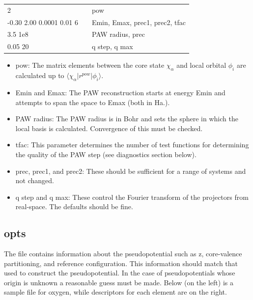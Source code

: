 \documentclass[11pt]{report}
\begin{document}
\begin{center}
\begin{tabular}{| l | c l |}
\hline
2						& &  pow \\
-0.30 2.00 0.0001 0.01 6		& & Emin, Emax, prec1, prec2, tfac \\
3.5 1e8					& & PAW radius, prec \\
0.05 20					& & q step, q max \\
\hline
\end{tabular}
\end{center}

\begin{itemize}
\item pow: The matrix elements between the core state $\chi_\alpha$ and local orbital $\phi_i$ are calculated
 up to $\langle \chi_\alpha \vert r^{pow} \vert \phi_i \rangle$. 
\item Emin and Emax: The PAW reconstruction starts at energy Emin and attempts to span the space to Emax (both in Ha.). 
\item PAW radius: The PAW radius is in Bohr and sets the sphere in which the local basis is calculated. Convergence of this must be checked. 
\item tfac: This parameter determines the number of test functions for determining the quality of the PAW step (see diagnostics section below).
\item prec, prec1, and prec2: These should be sufficient for a range of systems and not changed.
\item q step and q max: These control the Fourier transform of the projectors from real-space. The defaults should be fine.
\end{itemize}




\subsection{opts}
\label{opts}
The  file contains information about the pseudopotential such as z, core-valence partitioning, and reference configuration. This information should match that used to construct the pseudopotential. In the case of pseudopotentials 
whose origin is unknown a reasonable guess must be made. Below (on the left) is a sample  file for oxygen, while descriptors for each element are on the right.
\end{document}
